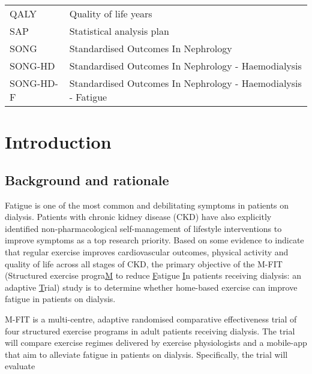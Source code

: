 \documentclass[
]{article}
\begin{document}
\begin{table}[H]
\begin{tabular}{p{}p{}}
    QALY          & Quality of life years                                                                                            \\
    SAP           & Statistical analysis plan                                                                                        \\
    SONG          & Standardised Outcomes In Nephrology                                                                              \\
    SONG-HD       & Standardised Outcomes In Nephrology - Haemodialysis                                                              \\
    SONG-HD-F     & Standardised Outcomes In Nephrology - Haemodialysis - Fatigue                                                    \\
    \bottomrule
  \end{tabular}
\end{table}

\clearpage

\hypertarget{introduction}{%
  \section{Introduction}\label{Introduction}}


\hypertarget{background}{%
  \subsection{Background and rationale}\label{background}}

Fatigue is one of the most common and debilitating symptoms in patients on dialysis.
Patients with chronic kidney disease (CKD) have also explicitly identified non-pharmacological self-management of lifestyle interventions to improve symptoms as a top research priority.
Based on some evidence to indicate that regular exercise improves cardiovascular outcomes, physical activity and quality of life across all stages of CKD, the primary objective of the M-FIT (Structured exercise progra\underline{M} to reduce \underline{F}atigue \underline{I}n patients receiving dialysis: an adaptive \underline{T}rial) study is to determine whether home-based exercise can improve fatigue in patients on dialysis.

M-FIT is a multi-centre, adaptive randomised comparative effectiveness trial of four structured exercise programs in adult patients receiving dialysis.
The trial will compare exercise regimes delivered by exercise physiologists and a mobile-app that aim to alleviate fatigue in patients on dialysis.
Specifically, the trial will evaluate
\end{document}
